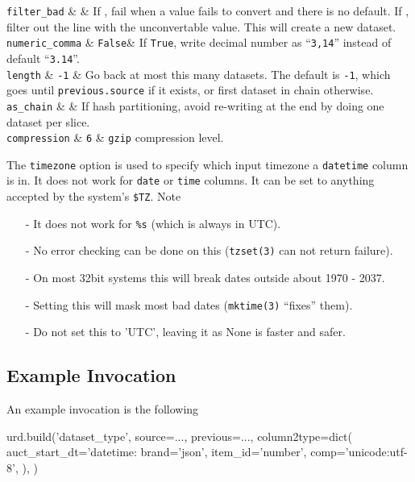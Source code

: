   \RP \texttt{filter\_bad} & \pyFalse & If \pyFalse, fail when a value
  fails to convert and there is no default.  If \pyTrue, filter out
  the line with the unconvertable value.  This will create a new dataset.\\

  \RP \texttt{numeric\_comma} & \texttt{False}&
  If \texttt{True}, write decimal number as
  ``\texttt{3,14}'' instead of default ``\texttt{3.14}''.\\

  \RP \texttt{length} & \texttt{-1} & Go back at most this many
  datasets. The default is \texttt{-1}, which goes
  until \texttt{previous.source} if it exists, or first dataset in
  chain otherwise.\\

  \RP \texttt{as\_chain} & \pyFalse & If hash partitioning, avoid
  re-writing at the end by doing one dataset per slice.\\

  \RP \texttt{compression} & \texttt{6} & \texttt{gzip} compression level.\\
\stoptable

\noindent The \texttt{timezone} option is used to specify which input
timezone a \texttt{datetime} column is in.  It does not work for
\texttt{date} or \texttt{time} columns.  It can be set to anything
accepted by the system's \texttt{\$TZ}.  Note
\begin{itemize}
\item[-] It does not work for \texttt{\%s} (which is always in UTC).
\item[-] No error checking can be done on this (\texttt{tzset(3)} can not return failure).
\item[-] On most 32bit systems this will break dates outside about 1970 - 2037.
\item[-] Setting this will mask most bad dates (\texttt{mktime(3)} ``fixes'' them).
\item[-] Do not set this to 'UTC', leaving it as None is faster and safer.
\end{itemize}



\subsection{Example Invocation}
An example invocation is the following
\begin{python}
urd.build('dataset_type',
    source=...,
    previous=...,
    column2type=dict(
        auct_start_dt='datetime:%
        brand='json',
        item_id='number',
        comp='unicode:utf-8',
    ),
)
\end{python}


